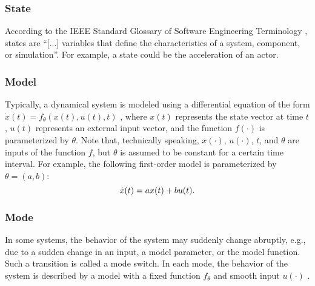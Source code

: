 \subsubsection{State}
\label{sec:state}
According to the IEEE Standard Glossary of Software Engineering Terminology \cite{ieee1990glossary}, states are ``[...] variables that define the characteristics of a system, component, or simulation''. For example, a state could be the acceleration of an actor.

\subsubsection{Model}
\label{sec:model}
Typically, a dynamical system is modeled using a differential equation of the form $\dot{x}(t)=f_{\theta}(x(t), u(t), t)$ \cite{norman2011control}, where $x(t)$ represents the state vector at time $t$, $u(t)$ represents an external input vector, and the function $f(\cdot)$ is parameterized by $\theta$. \cbstart Note that, technically speaking, $x(\cdot)$, $u(\cdot)$, $t$, and $\theta$ are inputs of the function $f$, but $\theta$ is assumed to be constant for a certain time interval. For example, the following first-order model is parameterized by $\theta=(a,b)$:
\begin{equation}
	\dot{x}(t) = a x(t) + b u(t).
\end{equation}
\cbend


\subsubsection{Mode}
\label{sec:mode}
In some systems, the behavior of the system may suddenly change abruptly, e.g., due to a sudden change in an input, a model parameter, or the model function. Such a transition is called a mode switch.
In each mode, the behavior of the system is described by a model with a fixed function $f_{\theta}$ and smooth input $u(\cdot)$ \cite{deschutter2000optimal}.

